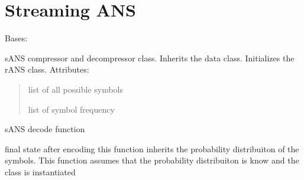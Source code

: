 \documentclass[letterpaper,10pt,english]{sphinxmanual}
\begin{document}
\sphinxstepscope


\section{Streaming ANS}
\label{\detokenize{sANS:module-sANS}}\label{\detokenize{sANS:streaming-ans}}\label{\detokenize{sANS::doc}}

\begin{fulllineitems}
\label{\detokenize{sANS:sANS.sANS}}
\pysigstartsignatures
{}
\pysigstopsignatures
\sphinxAtStartPar
Bases: {\hyperref[\detokenize{core:core.data.Data}]{}}

\sphinxAtStartPar
sANS compressor and decompressor class. Inherits the data class.
Initializes the rANS class. 
Attributes:
\begin{quote}
\begin{description}
\sphinxAtStartPar
list of all possible symbols

\sphinxAtStartPar
list of symbol frequency

\end{description}
\end{quote}

\begin{fulllineitems}
\label{\detokenize{sANS:sANS.sANS.decode}}
\pysigstartsignatures
{}
\pysigstopsignatures
\sphinxAtStartPar
sANS decode function
\begin{description}
\begin{description}
\sphinxAtStartPar
final state after encoding 
this function inherits the probability distribuiton of the symbols.
This function assumes that the probability distribuiton is know and the class is instantiated


\end{description}
\end{description}
\end{fulllineitems}
\end{fulllineitems}
\end{document}
